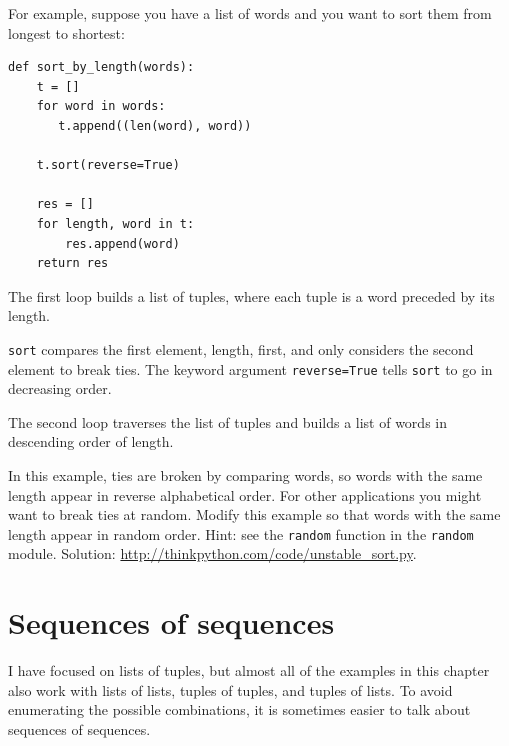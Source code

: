 \documentclass[10pt]{book}
\begin{document}
\label{DSU}

For example, suppose you have a list of words and you want to
sort them from longest to shortest:

\begin{verbatim}
def sort_by_length(words):
    t = []
    for word in words:
       t.append((len(word), word))

    t.sort(reverse=True)

    res = []
    for length, word in t:
        res.append(word)
    return res
\end{verbatim}
%
The first loop builds a list of tuples, where each
tuple is a word preceded by its length.

{\tt sort} compares the first element, length, first, and
only considers the second element to break ties.  The keyword argument
{\tt reverse=True} tells {\tt sort} to go in decreasing order.

The second loop traverses the list of tuples and builds a list of
words in descending order of length.

\begin{exercise}

In this example, ties are broken by comparing words, so words
with the same length appear in reverse alphabetical order.  For other
applications you might want to break ties at random.  Modify
this example so that words with the same length appear in
random order.  Hint: see the {\tt random} function in the
{\tt random} module.
Solution: \url{http://thinkpython.com/code/unstable_sort.py}.


\end{exercise}


\section{Sequences of sequences}

I have focused on lists of tuples, but almost all of the examples in
this chapter also work with lists of lists, tuples of tuples, and
tuples of lists.  To avoid enumerating the possible combinations, it
is sometimes easier to talk about sequences of sequences.
\end{document}
